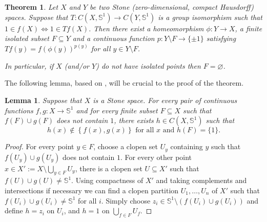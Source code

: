 \documentclass[letter,11pt]{amsart}
\theoremstyle{plain}		\newtheorem{theorem}[generalnumbering]{Theorem}
\theoremstyle{plain}		\newtheorem{corollary}[generalnumbering]{Corollary}
\theoremstyle{definition}		\newtheorem{definition}[generalnumbering]{Definition}
\theoremstyle{definition}		\newtheorem{example}[generalnumbering]{Example}
\theoremstyle{plain}		\newtheorem{proposition}[generalnumbering]{Proposition}
\theoremstyle{plain}		\newtheorem{lemma}[generalnumbering]{Lemma}
\theoremstyle{definition}
\begin{document}
\begin{theorem}\label{theoremisomorphismgroupifcirclevaluedfunctions}
	Let $X$ and $Y$ be two Stone (zero-dimensional, compact Hausdorff) spaces. Suppose that $T\colon C(X,\mathbb{S}^1)\to C(Y,\mathbb{S}^1)$ is a group isomorphism such that $1\in f(X)\iff 1\in Tf(X)$. Then there exist a homeomorphism $\phi\colon Y\to X$, a finite isolated subset $F\subseteq Y$ and a continuous function $p\colon Y\setminus F\to\{\pm 1\}$ satisfying $Tf(y)=f(\phi(y))^{p(y)}$ for all $y\in Y\setminus F$.
	
	In particular, if $X$ (and/or $Y$) do not have isolated points then $F=\varnothing$.
\end{theorem}

The following lemma, based on \cite{MR3162258}, will be crucial to the proof of the theorem.

\begin{lemma}\label{lemmatheoremisomorphismgroupifcirclevaluedfunctions}
	Suppose that $X$ is a Stone space. For every pair of continuous functions $f,g\colon X\to\mathbb{S}^1$ and for every finite subset $F\subseteq X$ such that $f(F)\cup g(F)$ does not contain $1$, there exists $h\in C(X,\mathbb{S}^1)$ such that
	\[h(x)\not\in\left\{f(x),g(x)\right\}\text{ for all }x\text{ and }h(F)=\{1\}.\]
\end{lemma}
\begin{proof}
	For every point $y\in F$, choose a clopen set $U_y$ containing $y$ such that $f(U_y)\cup g(U_y)$ does not contain $1$. For every other point $x\in X':=X\setminus\bigcup_{y\in F}U_y$, there is a clopen set $U\subseteq X'$ such that $f(U)\cup g(U)\neq\mathbb{S}^1$. Using compactness of $X'$ and taking complements and intersections if necessary we can find a clopen partition $U_1,\ldots,U_n$ of $X'$ such that $f(U_i)\cup g(U_i)\neq\mathbb{S}^1$ for all $i$. Simply choose $z_i\in \mathbb{S}^1\setminus(f(U_i)\cup g(U_i))$ and define $h=z_i$ on $U_i$, and $h=1$ on $\bigcup_{f\in F}U_f$.
\end{proof}
\end{document}
